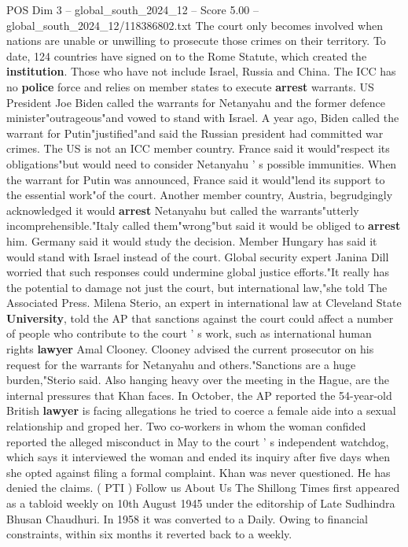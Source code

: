 \begin{textsample}{POS Dim 3 – global\_south\_2024\_12 – Score 5.00 – global\_south\_2024\_12/118386802.txt}
The court only becomes involved when nations are unable or unwilling to prosecute those crimes on their territory.
To date, 124 countries have signed on to the Rome Statute, which created the \textbf{institution}.
Those who have not include Israel, Russia and China.
The ICC has no \textbf{police} force and relies on member states to execute \textbf{arrest} warrants.
US President Joe Biden called the warrants for Netanyahu and the former defence minister"outrageous"and vowed to stand with Israel.
A year ago, Biden called the warrant for Putin"justified"and said the Russian president had committed war crimes.
The US is not an ICC member country.
France said it would"respect its obligations"but would need to consider Netanyahu ' s possible immunities.
When the warrant for Putin was announced, France said it would"lend its support to the essential work"of the court.
Another member country, Austria, begrudgingly acknowledged it would \textbf{arrest} Netanyahu but called the warrants"utterly incomprehensible."Italy called them"wrong"but said it would be obliged to \textbf{arrest} him.
Germany said it would study the decision.
Member Hungary has said it would stand with Israel instead of the court.
Global security expert Janina Dill worried that such responses could undermine global justice efforts."It really has the potential to damage not just the court, but international law,"she told The Associated Press.
Milena Sterio, an expert in international law at Cleveland State \textbf{University}, told the AP that sanctions against the court could affect a number of people who contribute to the court ' s work, such as international human rights \textbf{lawyer} Amal Clooney.
Clooney advised the current prosecutor on his request for the warrants for Netanyahu and others."Sanctions are a huge burden,"Sterio said.
Also hanging heavy over the meeting in the Hague, are the internal pressures that Khan faces.
In October, the AP reported the 54-year-old British \textbf{lawyer} is facing allegations he tried to coerce a female aide into a sexual relationship and groped her.
Two co-workers in whom the woman confided reported the alleged misconduct in May to the court ' s independent watchdog, which says it interviewed the woman and ended its inquiry after five days when she opted against filing a formal complaint.
Khan was never questioned.
He has denied the claims. ( PTI ) Follow us About Us The Shillong Times first appeared as a tabloid weekly on 10th August 1945 under the editorship of Late Sudhindra Bhusan Chaudhuri.
In 1958 it was converted to a Daily.
Owing to financial constraints, within six months it reverted back to a weekly.

\end{textsample}
